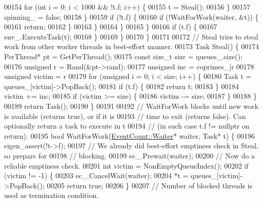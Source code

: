 \begin{DoxyCode}
{00154             \textcolor{keywordflow}{for} (\textcolor{keywordtype}{int} i = 0; i < 1000 && !t.f; i++) \{
00155               t = Steal();
00156             \}
00157             spinning\_ = \textcolor{keyword}{false};
00158           \}
00159           \textcolor{keywordflow}{if} (!t.f) \{
00160             \textcolor{keywordflow}{if} (!WaitForWork(waiter, &t)) \{
00161               \textcolor{keywordflow}{return};
00162             \}
00163           \}
00164         \}
00165       \}
00166       \textcolor{keywordflow}{if} (t.f) \{
00167         env\_.ExecuteTask(t);
00168       \}
00169     \}
00170   \}
00171 
00172   \textcolor{comment}{// Steal tries to steal work from other worker threads in best-effort manner.}
00173   Task Steal() \{
00174     PerThread* pt = GetPerThread();
00175     \textcolor{keyword}{const} \textcolor{keywordtype}{size\_t} size = queues\_.size();
00176     \textcolor{keywordtype}{unsigned} r = Rand(&pt->rand);
00177     \textcolor{keywordtype}{unsigned} inc = coprimes\_[r %
00178     \textcolor{keywordtype}{unsigned} victim = r %
00179     \textcolor{keywordflow}{for} (\textcolor{keywordtype}{unsigned} i = 0; i < size; i++) \{
00180       Task t = queues\_[victim]->PopBack();
00181       \textcolor{keywordflow}{if} (t.f) \{
00182         \textcolor{keywordflow}{return} t;
00183       \}
00184       victim += inc;
00185       \textcolor{keywordflow}{if} (victim >= size) \{
00186         victim -= size;
00187       \}
00188     \}
00189     \textcolor{keywordflow}{return} Task();
00190   \}
00191 
00192   \textcolor{comment}{// WaitForWork blocks until new work is available (returns true), or if it is}
00193   \textcolor{comment}{// time to exit (returns false). Can optionally return a task to execute in t}
00194   \textcolor{comment}{// (in such case t.f != nullptr on return).}
00195   \textcolor{keywordtype}{bool} WaitForWork(\hyperlink{class_eigen_1_1_event_count_1_1_waiter}{EventCount::Waiter}* waiter, Task* t) \{
00196     eigen\_assert(!t->f);
00197     \textcolor{comment}{// We already did best-effort emptiness check in Steal, so prepare for}
00198     \textcolor{comment}{// blocking.}
00199     ec\_.Prewait(waiter);
00200     \textcolor{comment}{// Now do a reliable emptiness check.}
00201     \textcolor{keywordtype}{int} victim = NonEmptyQueueIndex();
00202     \textcolor{keywordflow}{if} (victim != -1) \{
00203       ec\_.CancelWait(waiter);
00204       *t = queues\_[victim]->PopBack();
00205       \textcolor{keywordflow}{return} \textcolor{keyword}{true};
00206     \}
00207     \textcolor{comment}{// Number of blocked threads is used as termination condition.}
}
\end{DoxyCode}
